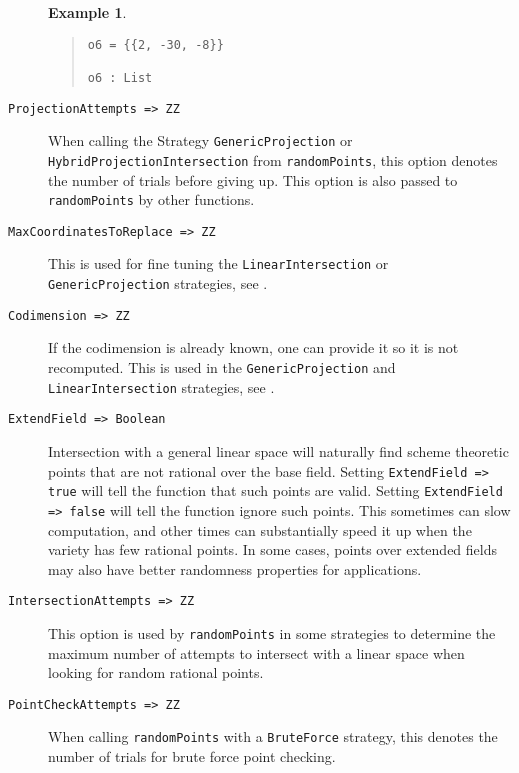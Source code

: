 \documentclass[11pt]{amsart}
\theoremstyle{definition}
\newtheorem{example}{Example}[section]
\begin{document}
\begin{description}
\begin{example}
{\begin{quote}
\begin{verbatim}
o6 = {{2, -30, -8}}

o6 : List
        \end{verbatim}
    \end{quote}
        }
    \end{example}%
    \vspace{-1em}
    \item[\tt ProjectionAttempts => ZZ] 

    When calling the Strategy {\tt GenericProjection} or \\
    {\tt HybridProjectionIntersection} from {\tt randomPoints}, this option denotes the number of trials before giving up.  This option is also passed to {\tt randomPoints} by other functions.

    \item[\tt MaxCoordinatesToReplace => ZZ] This is used for fine tuning the {\tt LinearIntersection} or {\tt GenericProjection} strategies, see .
    \item[\tt Codimension => ZZ] If the codimension is already known, one can provide it so it is not recomputed.  This is used in the {\tt GenericProjection} and {\tt LinearIntersection} strategies, see .

    \item[\tt ExtendField => Boolean] 

    Intersection with a general linear space will naturally find scheme theoretic points that are not rational over the base field.  
    Setting {\tt ExtendField => true} will tell the function that such points are valid.  Setting {\tt ExtendField => false} will tell the function ignore such points.  This sometimes can slow computation, and other times can substantially speed it up when the variety has few rational points.  In some cases, points over extended fields may also have better randomness properties for applications.


    \item[\tt IntersectionAttempts => ZZ]

    This option is used by {\tt randomPoints} in some strategies to determine the maximum number of attempts to intersect with a linear space when looking for random rational points.  %

    \item[\tt PointCheckAttempts => ZZ]

    When calling {\tt randomPoints} with a {\tt BruteForce} strategy, this denotes the number of trials for brute force point checking.
    

\end{description}
\end{document}
